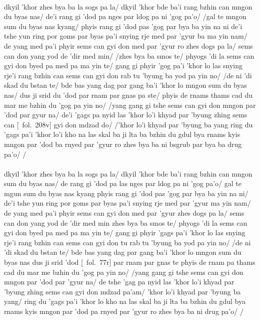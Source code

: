 \documentclass[12pt]{article}
\begin{document}
\textbf{\TVA}\\
dkyil 'khor zhes bya ba la sogs pa la/ dkyil 'khor bde ba'i rang bzhin can mngon du byas nas/ de'i rang gi 'dod pa nges par ldog pa ni 'gog pa'o/ /gal te mngon sum du byas nas kyang/ phyis rang gi 'dod pas 'gog par bya ba yin na ni de'i tshe yun ring por goms par byas pa'i snying rje med par 'gyur ba ma yin nam/ de yang med pa'i phyir sems can gyi don med par 'gyur ro zhes dogs pa la/ sems can don yang yod de 'dir med min/ /zhes bya ba smos te/ phyogs 'di la sems can gyi don byed pa med pa ma yin te/ gang gi phyir 'gog pa'i 'khor lo las snying rje'i rang bzhin can sems can gyi don rab tu 'byung ba yod pa yin no/ /de ni 'di skad du bstan te/ bde bas yang dag par gang ba'i 'khor lo mngon sum du byas nas/ dus ji srid du 'dod par rnam par gnas pa ste/ phyis de rnams thams cad du mar me bzhin du 'gog pa yin no/ /yang gang gi tshe sems can gyi don mngon par 'dod par gyur na/ de'i 'gags pa nyid las 'khor lo'i khyad par 'byung zhing sems can [\TVA\ fol.\ 208v] gyi don mdzad do/ /'khor lo'i khyad par 'byung ba yang ring du 'gags pa'i 'khor lo'i kho na las skal ba ji lta ba bzhin du gdul bya rnams kyis mngon par 'dod ba rnyed par 'gyur ro zhes bya ba ni bsgrub par bya ba drug pa'o/ /\\

\textbf{\TVB}\\
dkyil 'khor zhes bya ba la sogs pa la/ dkyil 'khor bde ba'i rang bzhin can mngon sum du byas nas/ de rang gi 'dod pa las nges par ldog pa ni 'gog pa'o/ gal te mgun sum du byas nas kyang phyis rang gi 'dod pas 'gog par bya ba yin na ni/ de'i tshe yun ring por goms par byas pa'i snying rje med par 'gyur ma yin nam/ de yang med pa'i phyir sems can gyi don med par 'gyur zhes dogs pa la/ sems can don yang yod de 'dir med min zhes bya ba smos te/ phyogs 'di la sems can gyi don byed pa med pa ma yin te/ gang gi phyir 'gags pa'i 'khor lo las snying rje'i rang bzhin can sems can gyi don tu rab tu 'byung ba yod pa yin no/ /de ni 'di skad du bstan te/ bde bas yang dag par gang ba'i 'khor lo mngon sum du byas nas dus ji srid 'dod [\TVB\ fol.\ 77r] par rnam par gnas te phyis de rnam pa thams cad du mar me bzhin du 'gog pa yin no/ /yang gang gi tshe sems can gyi don mngon par 'dod par 'gyur na/ de tshe 'gag pa nyid las 'khor lo'i khyad par 'byung zhing sems can gyi don mdzad pa'am/ 'khor lo'i khyad par 'byung ba yang/ ring du 'gags pa'i 'khor lo kho na las skal ba ji lta ba bzhin du gdul bya rnams kyis mngon par 'dod pa rnyed par 'gyur ro zhes bya ba ni drug pa'o/ /
\end{document}
